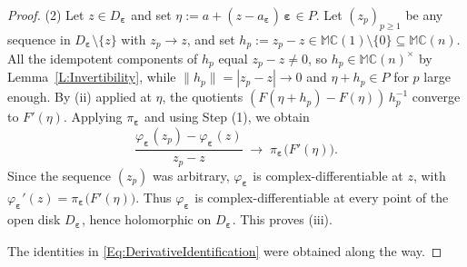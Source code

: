 \documentclass[10pt,a4paper]{amsart}
\newcommand{\bep}[1]{\bm{\varepsilon_{#1}}}
\newcommand{\mC}{\mathbb{C}}
\newcommand{\mM}{\mathbb{M}}
\newcommand{\ra}{\rightarrow}
\begin{document}
\begin{proof}
    (2) Let $z \in D_{\bep{}}$
    and set $\eta := a + ( z - a_{\bep{}} )\, \bep{} \in P$. Let $( z_p )_{p \geq 1}$
    be any sequence in $D_{\bep{}} \setminus \{ z \}$ with $z_p \ra z$, and set
    $h_p := z_p - z \in \mM \mC(1) \setminus \{ 0 \} \subseteq \mM \mC (n)$. All the idempotent
    components of $h_p$ equal $z_p - z \neq 0$, so
    $h_p \in \mM \mC(n)^\times$ by Lemma~\ref{L:Invertibility}, while
    $\| h_p \| = | z_p - z | \ra 0$ and $\eta + h_p \in P$ for $p$ large
    enough. By (ii) applied at $\eta$, the quotients
    $( F ( \eta + h_p ) - F ( \eta ) )\, h_p^{-1}$ converge to $F ' (\eta )$. Applying $\pi_{\bep{}}$ and using Step (1), we obtain
        \[
        \frac{ \varphi_{\bep{}} ( z_p ) - \varphi_{\bep{}} ( z ) }{ z_p - z }
        \; \longrightarrow \; \pi_{\bep{}} \big( F ' ( \eta ) \big).
        \]
    Since the sequence $( z_p )$ was arbitrary, $\varphi_{\bep{}}$ is
    complex-differentiable at $z$, with
    $\varphi_{\bep{}} ' ( z ) = \pi_{\bep{}} \big( F ' ( \eta ) \big)$. Thus $\varphi_{\bep{}}$ is
    complex-differentiable at every point of the open disk $D_{\bep{}}$, hence
    holomorphic on $D_{\bep{}}$. This proves (iii).
    
    The identities in \eqref{Eq:DerivativeIdentification} were
    obtained along the way.
    \end{proof}
\end{document}

